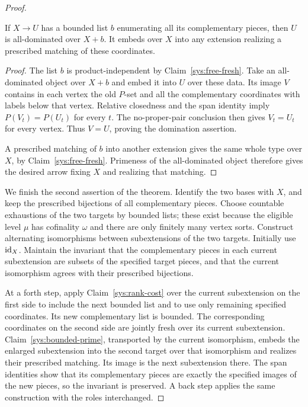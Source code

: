 \begin{proof}
\begin{claim}
\label{sys:bounded-prime}
If $X\to U$ has a bounded list $b$ enumerating all its
complementary pieces, then $U$ is all-dominated over $X+b$.
It embeds over $X$ into any extension realizing a prescribed
matching of these coordinates.
\end{claim}

\begin{proof}
The list $b$ is product-independent by
Claim~\ref{sys:free-fresh}.  Take an all-dominated object over
$X+b$ and embed it into $U$ over these data.  Its image $V$
contains in each vertex the old $P$-set and all the
complementary coordinates with labels below that vertex.
Relative closedness and the span identity imply
$P(V_t)=P(U_t)$ for every $t$.  The no-proper-pair conclusion
then gives $V_t=U_t$ for every vertex.  Thus $V=U$, proving
the domination assertion.

A prescribed matching of $b$ into another extension gives
the same whole type over $X$, by
Claim~\ref{sys:free-fresh}.  Primeness of the all-dominated
object therefore gives the desired arrow fixing $X$ and
realizing that matching.
\end{proof}

We finish the second assertion of the theorem.  Identify the two
bases with $X$, and keep the prescribed bijections of all
complementary pieces.  Choose countable exhaustions of the two
targets by bounded lists; these exist because the eligible level
$\mu$ has cofinality $\omega$ and there are only finitely many
vertex sorts.  Construct alternating isomorphisms between
subextensions of the two targets.  Initially use $\operatorname{id}_X$.
Maintain the invariant that the complementary pieces in each
current subextension are subsets of the specified target pieces,
and that the current isomorphism agrees with their prescribed
bijections.

At a forth step, apply Claim~\ref{sys:rank-cost} over the current
subextension on the first side to include the next bounded list
and to use only remaining specified coordinates.  Its new
complementary list is bounded.  The corresponding coordinates
on the second side are jointly fresh over its current
subextension.  Claim~\ref{sys:bounded-prime}, transported by the
current isomorphism, embeds the enlarged subextension into the
second target over that isomorphism and realizes their
prescribed matching.  Its image is the next subextension there.
The span identities show that its complementary pieces are
exactly the specified images of the new pieces, so the invariant
is preserved.  A back step applies the same construction with
the roles interchanged.


\end{proof}
